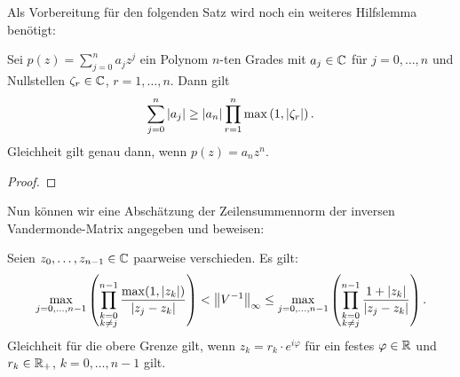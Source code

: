 Als Vorbereitung für den folgenden Satz wird noch ein weiteres Hilfslemma benötigt:

\begin{lemma}
    \label{lemma:polynom_coefficient_sum_inequality}
    Sei $p(z) = \sum_{j = 0}^{n} a_j z^j$ ein Polynom $n$-ten Grades mit
    $a_j \in \mathbb{C}$ für $j = 0, \dots, n$ und Nullstellen
    $\zeta_r \in \mathbb{C}$, $r = 1, \dots, n$.
    Dann gilt
    \begin{equation}
        \label{eq:polynom_coefficient_sum_inequality}
        \sum_{j=0}^{n} \left\lvert a_j \right\rvert \geq \left\lvert a_n \right\rvert \prod_{r=1}^{n} \max \left(1, \left\lvert \zeta_r \right\rvert \right).
    \end{equation}
    Gleichheit gilt genau dann, wenn $p(z) = a_n z^n$.
\end{lemma}

\begin{proof}
\end{proof}

Nun können wir eine Abschätzung der Zeilensummennorm der inversen
Vandermonde-Matrix angegeben und beweisen:
\begin{theorem}
  \label{thm:inverse_vandermonde_inequality}
  Seien $z_0, \dots, z_{n-1} \in \mathbb{C}$ paarweise verschieden.
  Es gilt:
  \begin{equation}
    \label{eq:inverse_vandermonde_inequality}
    \max_{j = 0, \dots, n-1} \left( \prod_{\substack{k = 0\\ k \neq j}}^{n-1} \frac{\max(1, \left\lvert z_k \right\rvert)}{\left\lvert z_j - z_k \right\rvert} \right)
    < \left\lVert V^{-1} \right\rVert_{\infty}
    \leq \max_{j = 0, \dots, n-1} \left( \prod_{\substack{k = 0\\ k \neq j}}^{n-1} \frac{1 + \left\lvert z_k \right\rvert}{\left\lvert z_j - z_k \right\rvert} \right).
  \end{equation}
  Gleichheit für die obere Grenze gilt, wenn $z_k = r_k \cdot e^{i \varphi}$
  für ein festes $\varphi \in \mathbb{R}$ und $r_k \in \mathbb{R}_{+}$, $k = 0, \dots, n-1$ gilt.
\end{theorem}

